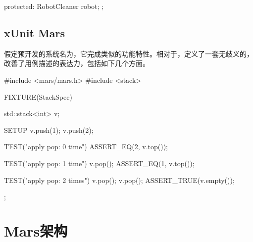\begin{content}
\begin{leftbar}
\begin{c++}
{protected:
  RobotCleaner robot;
};
  \end{c++}
\end{leftbar}

\subsection{xUnit Mars}

假定预开发的系统名为，它完成类似的功能特性。相对于，定义了一套无歧义的，改善了用例描述的表达力，包括如下几个方面。

\begin{enum}
\end{enum}

\begin{leftbar}
 \begin{c++}
#include <mars/mars.h>
#include <stack>

FIXTURE(StackSpec) {
  std::stack<int> v;   

  SETUP {
    v.push(1);
    v.push(2);
  }

  TEST("apply pop: 0 time") {
    ASSERT_EQ(2, v.top());
  }

  TEST("apply pop: 1 time") {
    v.pop();
    ASSERT_EQ(1, v.top());
  }

  TEST("apply pop: 2 times") {
    v.pop();
    v.pop();
    ASSERT_TRUE(v.empty());
  }
}; 
 \end{c++}
\end{leftbar}

\end{content}

\section{Mars架构}
	
